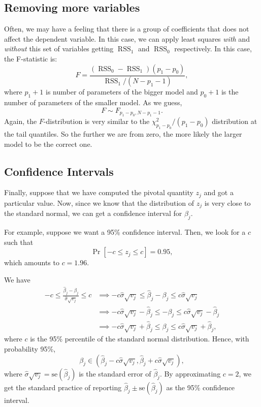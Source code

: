 \documentclass[11pt]{article}
\theoremstyle{definition}
\DeclareMathOperator*{\RSS}{RSS} \DeclareMathOperator*{\WRSS}{WRSS}
\begin{document}
\subsection{Removing more variables}
Often, we may have a feeling that there is a group of coefficients that does not
affect the dependent variable. In this case, we can apply least squares
\emph{with} and \emph{without} this set of variables getting $\RSS_1$ and
$\RSS_0$ respectively. In this case, the F-statistic is:
\[F=\frac{(\RSS_0-\RSS_1)(p_1-p_0)}{\RSS_1/(N-p_1-1)},\] where $p_1+1$ is number
of parameters of the bigger model and $p_0+1$ is the number of parameters of the
smaller model. As we guess,
\[F\sim F_{p_1-p_0,N-p_1-1}.\] Again, the $F$-distribution is very similar to
the $\chi^2_{p_1-p_0}/(p_1-p_0)$ distribution at the tail quantiles. So the
further we are from zero, the more likely the larger model to be the correct
one.

\subsection{Confidence Intervals}
Finally, suppose that we have computed the pivotal quantity $z_j$ and got a
particular value. Now, since we know that the distribution of $z_j$ is very
close to the standard normal, we can get a confidence interval for $\beta_j$.

For example, suppose we want a 95\% confidence interval. Then, we look for a $c$
such that
\[\Pr[-c\le z_j\le c]=0.95,\]
which amounts to $c=1.96.$

We have
\begin{equation}
	\begin{split}
		-c\le \frac{\hat\beta_j-\beta_j}{\hat\sigma\sqrt{v_j}}\le c &\implies
		-c\hat\sigma\sqrt{v_j} \le \hat\beta_j-\beta_j \le c\hat\sigma\sqrt{v_j} \\
		&\implies -c\hat\sigma\sqrt{v_j}-\hat\beta_j \le -\beta_j \le c\hat\sigma\sqrt{v_j}-\hat\beta_j \\
		&\implies -c\hat\sigma\sqrt{v_j}+\hat\beta_j \le \beta_j \le c\hat\sigma\sqrt{v_j}+\hat\beta_j,
	\end{split}
\end{equation}
where $c$ is the 95\% percentile of the standard normal distribution. Hence,
with probability 95\%,
\[\beta_j\in
	(\hat\beta_j-c\hat\sigma\sqrt{v_j},\hat\beta_j+c\hat\sigma\sqrt{v_j}),\] where
$\hat\sigma\sqrt{v_j}=\mathrm{se}(\hat\beta_j)$ is the standard error of
$\hat\beta_j$. By approximating $c=2$, we get the standard practice of reporting
$\hat\beta_j\pm \mathrm{se}(\hat\beta_j)$ as the 95\% confidence interval.
\end{document}
